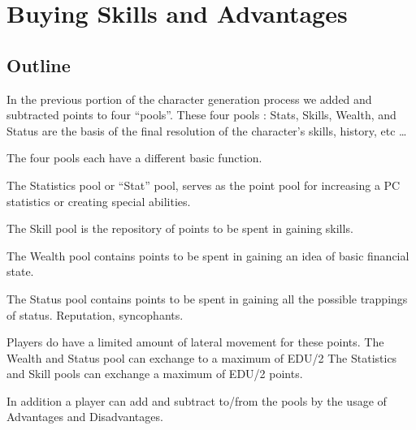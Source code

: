 \chapter{Buying Skills and Advantages}

\section{Outline}

In the previous portion of the character generation process we added 
and subtracted points to four ``pools''. These four pools : Stats, 
Skills, Wealth, and Status are the basis of the final resolution of 
the character's skills, history, etc \dots

The four pools each have a different basic function.

The Statistics pool or ``Stat'' pool, serves as the point pool for 
increasing a PC statistics or creating special abilities.

The Skill pool is the repository of points to be spent in gaining 
skills.

The Wealth pool contains points to be spent in gaining an idea of 
basic financial state.

The Status pool contains points to be spent in gaining all the 
possible trappings of status. Reputation, syncophants.

Players do have a limited amount of lateral movement for these 
points. The Wealth and Status pool can exchange to a maximum of EDU/2
The Statistics and Skill pools can exchange a maximum of EDU/2 
points.

In addition a player can add and subtract to/from the pools by the 
usage of Advantages and Disadvantages.



